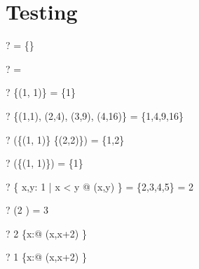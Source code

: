 \documentclass{article}
\begin{document}
\section{Testing \ran}
\begin{zed} \vdash? \ran \emptyset = \{\} \end{zed}
\begin{zed} \vdash? \ran \emptyset = \emptyset \end{zed}
\begin{zed} \vdash? \ran \{(1, 1)\} = \{1\} \end{zed}
\begin{zed} \vdash? \ran \{(1,1), (2,4), (3,9), (4,16)\} = \{1,4,9,16\} \end{zed}
\begin{zed} \vdash? \ran (\{(1, 1)\} \cup \{(2,2)\}) = \{1,2\} \end{zed}
\begin{zed} \vdash? \ran (\emptyset \cup \{(1, 1)\}) = \{1\} \end{zed}
\begin{zed} \vdash? \ran \{ x,y: 1  | x < y @ (x,y) \} = \{2,3,4,5\} = 2  \end{zed}
\begin{zed} \vdash? \ran (2   ) = 3  \end{zed}
\begin{zed} \vdash? 2 \in \ran \{x:\nat @ (x,x+2) \} \end{zed}
\begin{zed} \vdash? 1 \notin \ran \{x:\nat @ (x,x+2) \} \end{zed}
\end{document}
